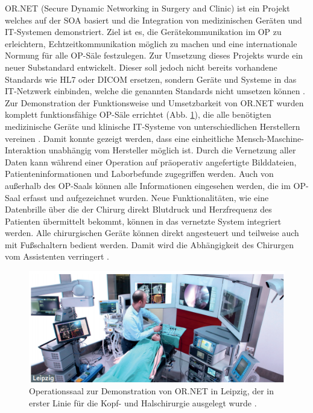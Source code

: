 OR.NET (Secure Dynamic Networking in Surgery and Clinic) ist ein Projekt welches auf der SOA basiert und die Integration von medizinischen Geräten und IT-Systemen demonstriert. Ziel ist es, die Gerätekommunikation im OP zu erleichtern, Echtzeitkommunikation möglich zu machen und eine internationale Normung für alle OP-Säle festzulegen. Zur Umsetzung dieses Projekts wurde ein neuer Substandard entwickelt. Dieser soll jedoch nicht bereits vorhandene Standards wie HL7 oder DICOM ersetzen, sondern Geräte und Systeme in das IT-Netzwerk einbinden, welche die genannten Standards nicht umsetzen können \cite{ORnetWebsite}.\\
Zur Demonstration der Funktionsweise und Umsetzbarkeit von OR.NET wurden komplett funktionsfähige OP-Säle errichtet (Abb. \ref{fig:ornet}), die alle benötigten medizinische Geräte und klinische IT-Systeme von unterschiedlichen Herstellern vereinen \cite{ORnet}. Damit konnte gezeigt werden, dass eine einheitliche Mensch-Maschine-Interaktion unabhängig vom Hersteller möglich ist. Durch die Vernetzung aller Daten kann während einer Operation auf präoperativ angefertigte Bilddateien, Patienteninformationen und Laborbefunde zugegriffen werden. Auch von außerhalb des OP-Saals können alle Informationen eingesehen werden, die im OP-Saal erfasst und aufgezeichnet wurden. Neue Funktionalitäten, wie eine Datenbrille über die der Chirurg direkt Blutdruck und Herzfrequenz des Patienten übermittelt bekommt, können in das vernetzte System integriert werden. Alle chirurgischen Geräte können direkt angesteuert und teilweise auch mit Fußschaltern bedient werden. Damit wird die Abhängigkeit des Chirurgen vom Assistenten verringert \cite{ORnetWebsite}.

\begin{figure} [H]
	\includegraphics[scale = 0.8]{Content/Pictures/ornet.png}
	\caption{Operationssaal zur Demonstration von OR.NET in Leipzig, der in erster Linie für die Kopf- und Halschirurgie ausgelegt wurde \cite{ORnetWebsite}.}
	\label{fig:ornet}
\end{figure}

